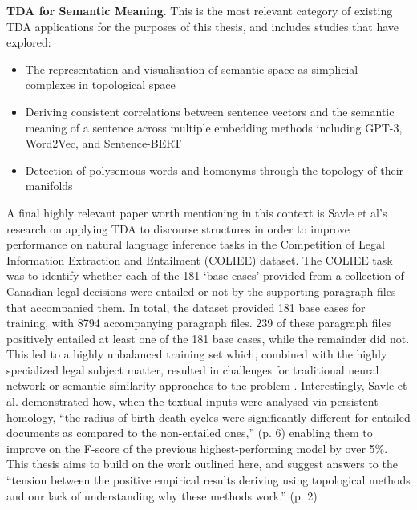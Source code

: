 \documentclass[12pt,twoside]{report}
\begin{document}
\textbf{TDA for Semantic Meaning}. This is the most relevant category of existing TDA applications for the purposes of this thesis, and includes studies that have explored:
\begin{itemize} [itemsep=0pt]
    \item The representation and visualisation of semantic space as simplicial complexes in topological space \cite{CHIANG2007256, karlgren2014}
    \item Deriving consistent correlations between sentence vectors and the semantic meaning of a sentence across multiple embedding methods including GPT-3, Word2Vec, and Sentence-BERT \cite{sun2023topologicalinterpretationsgpt3}
    \item Detection of polysemous words \cite{jakubowski-etal-2020-topology} and homonyms \cite{temčinas2018localhomologywordembeddings} through the topology of their manifolds 
\end{itemize} 

A final highly relevant paper worth mentioning in this context is Savle et al's \cite{savle-etal-2019-topological} research on applying TDA to discourse structures in order to improve performance on natural language inference tasks in the Competition of Legal Information Extraction and Entailment (COLIEE) dataset. The COLIEE task was to identify whether each of the 181 `base cases' provided from a collection of Canadian legal decisions were entailed or not by the supporting paragraph files that accompanied them. In total, the dataset provided 181 base cases for training, with 8794 accompanying paragraph files. 239 of these paragraph files positively entailed at least one of the 181 base cases, while the remainder did not. This led to a highly unbalanced training set which, combined with the highly specialized legal subject matter, resulted in challenges for traditional neural network or semantic similarity approaches to the problem \cite{savle-etal-2019-topological}. Interestingly, Savle et al. demonstrated how, when the textual inputs were analysed via persistent homology, ``the radius of birth-death cycles were significantly different for entailed documents as compared to the non-entailed ones,'' (p. 6) \cite{savle-etal-2019-topological} enabling them to improve on the F-score of the previous highest-performing model by over 5\%. This thesis aims to build on the work outlined here, and suggest answers to the ``tension between the positive empirical results deriving using topological methods and our lack of understanding why these methods work.'' (p. 2)\cite{savle-etal-2019-topological}
\end{document}

